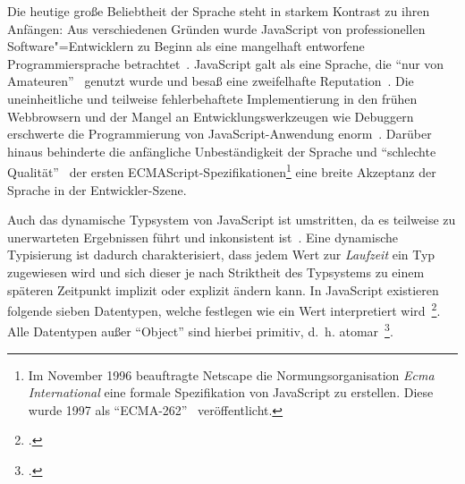 Die heutige große Beliebtheit der Sprache steht in starkem Kontrast zu ihren Anfängen: Aus verschiedenen Gründen wurde JavaScript von professionellen Software"=Entwicklern zu Beginn als eine mangelhaft entworfene Programmiersprache betrachtet~\autocite{CROCKFORD:JS_POPULAR}. JavaScript galt als eine Sprache, die \enquote{nur von Amateuren}~\autocite{CROCKFORD:JS_MISUNDERSTOOD} genutzt wurde und besaß eine zweifelhafte Reputation~\autocite{THIEMANN:2005,THOMAS:2007}. Die uneinheitliche und teilweise fehlerbehaftete Implementierung in den frühen Webbrowsern und der Mangel an Entwicklungswerkzeugen wie Debuggern erschwerte die Programmierung von JavaScript-Anwendung enorm~\autocite{OREILLY:JS_HOW_DID_WE_GET_THERE}. Darüber hinaus behinderte die anfängliche Unbeständigkeit der Sprache und \enquote{schlechte Qualität}~\autocite{CROCKFORD:JS_MISUNDERSTOOD} der ersten ECMAScript-Spezifikationen\footnote{Im November 1996 beauftragte Netscape die Normungsorganisation \textit{Ecma International} eine formale Spezifikation von JavaScript zu erstellen. Diese wurde 1997 als \enquote{ECMA-262}~\autocite{ECMASCRIPT:1997} veröffentlicht.} eine breite Akzeptanz der Sprache in der Entwickler-Szene.



Auch das dynamische Typsystem von JavaScript ist umstritten, da es teilweise zu unerwarteten Ergebnissen führt und inkonsistent ist~\autocite{PRADEL:2015,RICHARDS:2010}. Eine dynamische Typisierung ist dadurch charakterisiert, dass jedem Wert zur \emph{Laufzeit} ein Typ zugewiesen wird und sich dieser je nach Striktheit des Typsystems zu einem späteren Zeitpunkt implizit oder explizit ändern kann. In JavaScript existieren folgende sieben Datentypen, welche festlegen wie ein Wert interpretiert wird~\footcite[Abschn.~6.1]{ECMASCRIPT:2019}. Alle Datentypen außer \enquote{Object} sind hierbei primitiv, d.~h. atomar~\footcite[Abschn. 4.3.2]{ECMASCRIPT:2019}.

